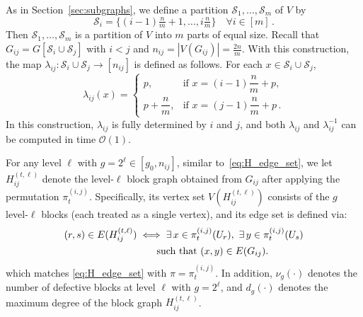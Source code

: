 \documentclass[journal]{IEEEtran}
\theoremstyle{definition}
\theoremstyle{definition}
\newcommand{\Sc}{\mathcal{S}}
\newcommand{\PV}{\nu}
\newcommand{\bigO}{\mathcal{O}}
\begin{document}
As in Section~\ref{sec:subgraphs}, we define a partition \(\Sc_1,\dots,\Sc_m\) of \(V\) by
\begin{equation}
     \label{eq:partition_V}
     \Sc_i = \{(i-1)\tfrac{n}{m}+1,\dots, i\tfrac{n}{m} \} \quad \forall i \in [m] \, .
\end{equation}
Then \(\Sc_1,\dots,\Sc_m\) is a partition of \(V\) into \(m\) parts of equal size.
Recall that \(G_{ij} = G[\Sc_i \cup \Sc_j]\) with \(i<j\) and
\(n_{ij} = |V(G_{ij})| = \tfrac{2n}{m}\).
With this construction, the map \(\lambda_{ij}\colon \Sc_i \cup \Sc_j \to [n_{ij}]\) is defined as follows.
For each \(x \in \Sc_i \cup \Sc_j\),
\begin{equation}
 \label{eq:fix_labeling}
    \lambda_{ij}(x) =
\begin{cases}
  p, & \text{if } x = (i-1)\dfrac{n}{m}+p,\\[2mm]
  p+\dfrac{n}{m},  & \text{if } x = (j-1)\dfrac{n}{m}+p \, .
\end{cases}
\end{equation}
In this construction, \(\lambda_{ij}\) is fully determined by \(i\) and \(j\), and both
\(\lambda_{ij}\) and \(\lambda_{ij}^{-1}\) can be computed in time \(\bigO(1)\).


For any level \(\ell\) with \(g = 2^{\ell} \in [g_0, n_{ij}]\), similar to~\eqref{eq:H_edge_set}, we let \(H_{ij}^{(t,\ell)}\) denote the 
level-\(\ell\) block graph obtained from \(G_{ij}\) after applying the permutation  \(\pi_t^{(i,j)}\). Specifically, its vertex set \(V(H_{ij}^{(t,\ell)})\) consists of the \(g\) level-\(\ell\) blocks (each treated as a single vertex), and its edge set is defined via:
\begin{align}
    (r,s)\in E(H_{ij}^{(t,\ell)}) \notag 
    &\iff \exists\, x\in \pi_{t}^{(i,j)}(U_r),\ 
       \exists\, y\in \pi_{t}^{(i,j)}(U_s) \notag \\
    &\hspace{2em} \text{such that } (x,y)\in E(G_{ij}).
    \label{eq:H_edge_set_t}
\end{align}
which matches \eqref{eq:H_edge_set} with $\pi = \pi_{t}^{(i,j)}$.  
In addition, \(\PV_g(\cdot)\) denotes the number of defective blocks at level \(\ell\) with \(g = 2^{\ell}\), and \(d_g(\cdot)\) denotes the maximum degree of the block graph $H_{ij}^{(t,\ell)}$.
\end{document}

